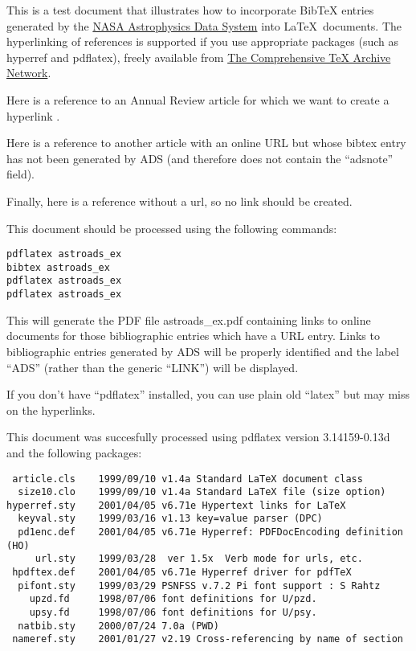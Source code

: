 \documentclass{article}
\begin{document}
This is a test document that illustrates how to incorporate
BibTeX entries generated by the
\href{http://ads.harvard.edu}{NASA Astrophysics Data System}
into \LaTeX\ documents.  The hyperlinking of references is
supported if you use appropriate packages (such as 
hyperref and pdflatex), freely available from
\href{http://www.ctan.org}{The Comprehensive TeX Archive Network}.

Here is a reference to an Annual Review article 
for which we want to create a hyperlink
\citet{1974ARA&A..12..279Z}.

Here is a reference to another article \citet{2000A&AS..143...85A}
with an online URL but whose
bibtex entry has not been generated by ADS (and therefore does not
contain the ``adsnote'' field).

Finally, here is a reference \citet{2000A&AS..143...61E}
without a url, so no link should be created.

This document should be processed using the following commands:

\begin{verbatim}
pdflatex astroads_ex
bibtex astroads_ex
pdflatex astroads_ex
pdflatex astroads_ex
\end{verbatim}

This will generate the PDF file astroads\_ex.pdf containing links
to online documents for those bibliographic entries which have a
URL entry.  Links to bibliographic entries generated by ADS will
be properly identified and the label ``ADS'' (rather than the generic
``LINK'') will be displayed.

If you don't have ``pdflatex'' installed, you can use plain old 
``latex'' but may miss on the hyperlinks.

This document was succesfully processed using 
pdflatex version 3.14159-0.13d and the following packages:

\begin{verbatim}
 article.cls    1999/09/10 v1.4a Standard LaTeX document class
  size10.clo    1999/09/10 v1.4a Standard LaTeX file (size option)
hyperref.sty    2001/04/05 v6.71e Hypertext links for LaTeX
  keyval.sty    1999/03/16 v1.13 key=value parser (DPC)
  pd1enc.def    2001/04/05 v6.71e Hyperref: PDFDocEncoding definition (HO)
     url.sty    1999/03/28  ver 1.5x  Verb mode for urls, etc.
 hpdftex.def    2001/04/05 v6.71e Hyperref driver for pdfTeX
  pifont.sty    1999/03/29 PSNFSS v.7.2 Pi font support : S Rahtz
    upzd.fd     1998/07/06 font definitions for U/pzd.
    upsy.fd     1998/07/06 font definitions for U/psy.
  natbib.sty    2000/07/24 7.0a (PWD)
 nameref.sty    2001/01/27 v2.19 Cross-referencing by name of section
\end{verbatim}


\end{document}
